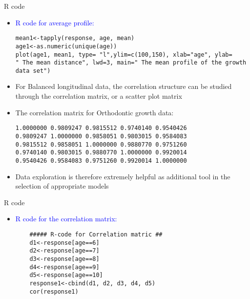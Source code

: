 \documentclass{beamer}
\begin{document}
\begin{frame}[fragile]{R code}
\begin{itemize}
\item \textcolor{blue}{ R code for average profile:} \vspace{0.5cm}

\begin{verbatim}
mean1<-tapply(response, age, mean)
age1<-as.numeric(unique(age))
plot(age1, mean1, type= "l",ylim=c(100,150), xlab="age", ylab=
" The mean distance", lwd=3, main=" The mean profile of the growth data set")
\end{verbatim}
\end{itemize}
\end{frame}



\begin{frame}[fragile]
\begin{itemize}
	\item For Balanced longitudinal data, the correlation structure can be studied through the correlation matrix, or a scatter plot matrix \vspace{0.25cm}
   \item The correlation matrix for Orthodontic growth data: \vspace{0.25cm}
\begin{verbatim}
1.0000000 0.9809247 0.9815512 0.9740140 0.9540426
0.9809247 1.0000000 0.9858051 0.9803015 0.9584083
0.9815512 0.9858051 1.0000000 0.9880770 0.9751260
0.9740140 0.9803015 0.9880770 1.0000000 0.9920014
0.9540426 0.9584083 0.9751260 0.9920014 1.0000000
\end{verbatim}
\vspace{0.25cm}
\item Data exploration is therefore extremely helpful as additional tool in the selection of appropriate models
\end{itemize}
\end{frame}

\begin{frame}[fragile]{R code}
\begin{itemize}
	\item \textcolor{blue}{ R code for the correlation matrix:} \vspace{0.5cm}
	
	\begin{verbatim}
	##### R-code for Correlation matric ##
	d1<-response[age==6]
	d2<-response[age==7]
	d3<-response[age==8]
	d4<-response[age==9]
	d5<-response[age==10]
	response1<-cbind(d1, d2, d3, d4, d5)
	cor(response1)
	\end{verbatim}
\end{itemize}
\end{frame}
\end{document}
